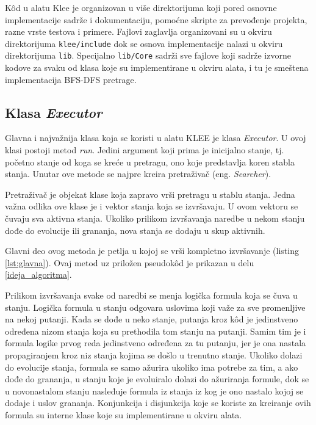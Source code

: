\documentclass[12pt,oneside]{memoir}
\begin{document}
K\^od u alatu Klee je organizovan u više direktorijuma koji pored osnovne implementacije sadrže i dokumentaciju, pomoćne skripte za prevođenje projekta, razne vrste testova i primere. Fajlovi zaglavlja organizovani su u okviru direktorijuma \texttt{klee/include} dok se osnova implementacije nalazi u okviru direktorijuma \texttt{lib}. Specijalno \texttt{lib/Core} sadrži sve fajlove koji sadrže izvorne kodove za svaku od klasa koje su implementirane u okviru alata, i tu je smeštena implementacija BFS-DFS pretrage.

\subsection{Klasa \textit{Executor}}
Glavna i najvažnija klasa koja se koristi u alatu KLEE je klasa \textit{Executor}. U ovoj klasi postoji metod \textit{run}. Jedini argument koji prima je inicijalno stanje, tj. početno stanje od koga se kreće u pretragu, ono koje predstavlja koren stabla stanja. Unutar ove metode se najpre kreira pretraživač (eng. \textit{Searcher}). 

Pretraživač je objekat klase koja zapravo vrši pretragu u stablu stanja. Jedna važna odlika ove klase je i vektor stanja koja se izvršavaju. U ovom vektoru se čuvaju sva aktivna stanja. Ukoliko prilikom izvršavanja naredbe u nekom stanju dođe do evolucije ili grananja, nova stanja se dodaju u skup aktivnih.

Glavni deo ovog metoda je petlja u kojoj se vrši kompletno izvršavanje (listing \ref{lst:glavna}). Ovaj metod uz priložen pseudok\^od je prikazan u delu \ref{ideja_algoritma}.

Prilikom izvršavanja svake od naredbi se menja logička formula koja se čuva u stanju. Logička formula u stanju odgovara uslovima koji važe za sve promenljive na nekoj putanji. Kada se dođe u neko stanje, putanja kroz k\^od je jedinstveno određena nizom stanja koja su prethodila tom stanju na putanji. Samim tim je i formula logike prvog reda jedinstveno određena za tu putanju, jer je ona nastala propagiranjem kroz niz stanja kojima se došlo u trenutno stanje. Ukoliko dolazi do evolucije stanja, formula se samo ažurira ukoliko ima potrebe za tim, a ako dođe do grananja, u stanju koje je evoluiralo dolazi do ažuriranja formule, dok se u novonastalom stanju nasleđuje formula iz stanja iz kog je ono nastalo kojoj se dodaje i uslov grananja. Konjunkcija i disjunkcija koje se koriste za kreiranje ovih formula su interne klase koje su implementirane u okviru alata.    
    
\end{document}
